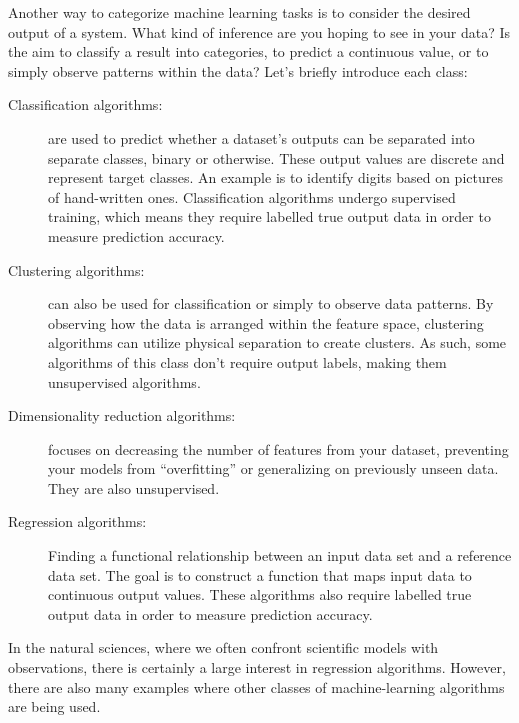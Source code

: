 \documentclass[%
oneside,                 %
final,                   %
10pt]{article}
\begin{document}
Another way to categorize machine learning tasks is to consider the
desired output of a system. What kind of inference are you hoping to see in your data? Is the aim to classify a result into categories, to predict a continuous value, or to simply observe patterns within the data? Let’s briefly introduce each class:

\begin{description}
\item[Classification algorithms:] 
  are used to predict whether a dataset’s outputs can be separated into separate classes, binary or otherwise. These output values are discrete and represent target classes. An example is to identify  digits based on pictures of hand-written ones. Classification algorithms undergo supervised training, which means they require labelled true output data in order to measure prediction accuracy.
\end{description}

\noindent
\begin{description}
\item[Clustering algorithms:] 
  can also be used for classification or simply to observe data patterns. By observing how the data is arranged within the feature space, clustering algorithms can utilize physical separation to create clusters. As such, some algorithms of this class don’t require output labels, making them unsupervised algorithms.
\end{description}

\noindent
\begin{description}
\item[Dimensionality reduction algorithms:] 
  focuses on decreasing the number of features from your dataset, preventing your models from “overfitting” or generalizing on previously unseen data. They are also unsupervised.
\end{description}

\noindent
\begin{description}
\item[Regression algorithms:] 
  Finding a functional relationship between an input data set and a reference data set. The goal is to construct a function that maps input data to continuous output values. These algorithms also require labelled true output data in order to measure prediction accuracy.
\end{description}

\noindent
In the natural sciences, where we often confront scientific models with observations, there is certainly a large interest in regression algorithms. However, there are also many examples where other classes of machine-learning algorithms are being used.
\end{document}
